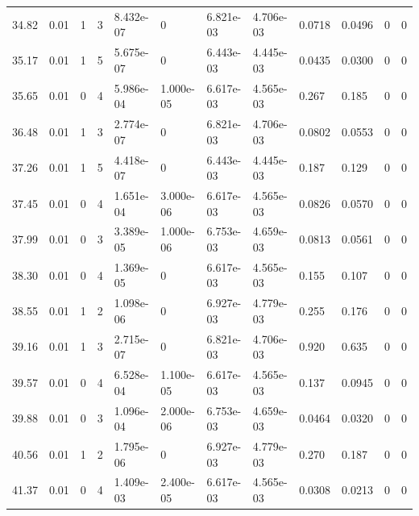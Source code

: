 \documentclass[preview]{standalone}
\begin{document}
{{{\begin{tabular}{L{1.2cm}C{1.2cm} C{0.3cm}C{0.5cm} C{1.4cm}C{1.4cm} C{1.4cm}C{1.4cm} C{1.6cm}C{1.6cm} C{1.6cm}C{1.6cm}}
  34.82  &  0.01  & 1     &  3 &  8.432e-07  & 0  &  6.821e-03&   4.706e-03& 0.0718 & 0.0496   &  0 & 0  \\ 
  35.17  &  0.01  & 1     &  5 &  5.675e-07  & 0  &  6.443e-03&   4.445e-03& 0.0435 & 0.0300   &  0 & 0  \\ 
  35.65  &  0.01  & 0     &  4 &  5.986e-04  & 1.000e-05  &  6.617e-03&   4.565e-03& 0.267 & 0.185   &  0 & 0  \\ 
  36.48  &  0.01  & 1     &  3 &  2.774e-07  & 0  &  6.821e-03&   4.706e-03& 0.0802 & 0.0553   &  0 & 0  \\ 
  37.26  &  0.01  & 1     &  5 &  4.418e-07  & 0  &  6.443e-03&   4.445e-03& 0.187 & 0.129   &  0 & 0  \\ 
  37.45  &  0.01  & 0     &  4 &  1.651e-04  & 3.000e-06  &  6.617e-03&   4.565e-03& 0.0826 & 0.0570   &  0 & 0  \\ 
  37.99  &  0.01  & 0     &  3 &  3.389e-05  & 1.000e-06  &  6.753e-03&   4.659e-03& 0.0813 & 0.0561   &  0 & 0  \\ 
  38.30  &  0.01  & 0     &  4 &  1.369e-05  & 0  &  6.617e-03&   4.565e-03& 0.155 & 0.107   &  0 & 0  \\ 
  38.55  &  0.01  & 1     &  2 &  1.098e-06  & 0  &  6.927e-03&   4.779e-03& 0.255 & 0.176   &  0 & 0  \\ 
  39.16  &  0.01  & 1     &  3 &  2.715e-07  & 0  &  6.821e-03&   4.706e-03& 0.920 & 0.635   &  0 & 0  \\ 
  39.57  &  0.01  & 0     &  4 &  6.528e-04  & 1.100e-05  &  6.617e-03&   4.565e-03& 0.137 & 0.0945   &  0 & 0  \\ 
  39.88  &  0.01  & 0     &  3 &  1.096e-04  & 2.000e-06  &  6.753e-03&   4.659e-03& 0.0464 & 0.0320   &  0 & 0  \\ 
  40.56  &  0.01  & 1     &  2 &  1.795e-06  & 0  &  6.927e-03&   4.779e-03& 0.270 & 0.187   &  0 & 0  \\ 
  41.37  &  0.01  & 0     &  4 &  1.409e-03  & 2.400e-05  &  6.617e-03&   4.565e-03& 0.0308 & 0.0213   &  0 & 0  \\ 
\hline 
\end{tabular} 

}}}
\end{document}

